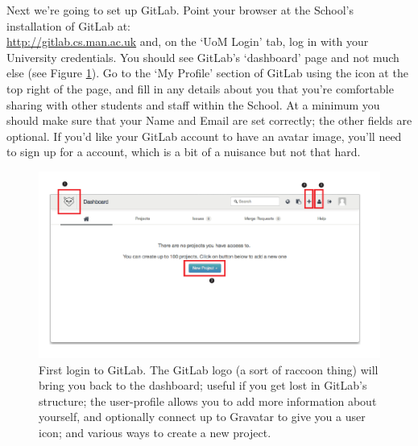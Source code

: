Next we're going to set up GitLab. Point your browser at the School's installation of GitLab at:
\\
\url{http://gitlab.cs.man.ac.uk}
and, on the `UoM Login' tab, log in with your University credentials. You should see GitLab's `dashboard' page and not much else (see Figure \ref{figure:GitLab-first-login}). Go to the `My Profile' section of GitLab using the icon at the top right of the page, and fill in any details about you that you're comfortable sharing with other students and staff within the School. At a minimum you should make sure that your Name and Email are set correctly; the other fields are optional. If you'd like your GitLab account to have an avatar image, you'll need to sign up for a  account, which is a bit of a nuisance but not that hard.

\begin{figure}
\centerline{\includegraphics[width=15cm]{images/GitLab-first-login}}
\caption{First login to GitLab. \protect{} The GitLab logo (a sort of raccoon thing) will bring you back to the dashboard; useful if you get lost in GitLab's structure; \protect{} the user-profile allows you to add more information about yourself, and optionally connect up to Gravatar to give you a user icon; and \protect{} various ways to create a new project.}\label{figure:GitLab-first-login}
\end{figure}

